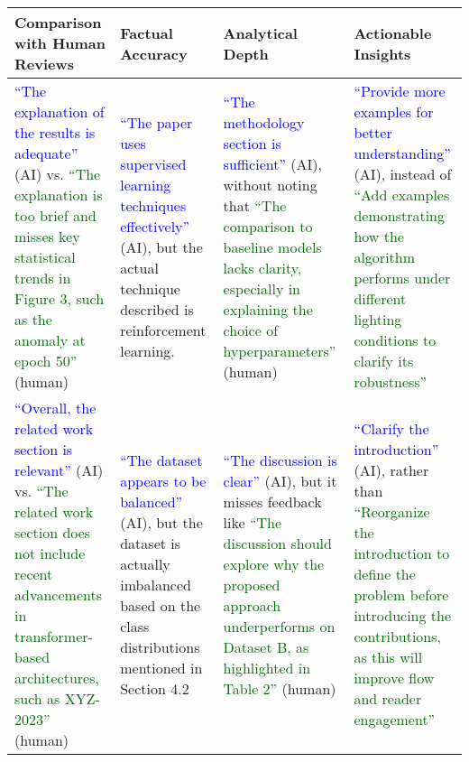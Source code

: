 \documentclass{article}
\begin{document}
\begin{table}[t]
\raggedright
\renewcommand{\arraystretch}{2}
\setlength{\tabcolsep}{8pt}
\begin{tabular}{|p{4cm}|p{4cm}|p{4cm}|p{4cm}|}
\hline
\textbf{\fontsize{12pt}{22pt}\selectfont Comparison with Human Reviews} & \textbf{\fontsize{12pt}{22pt}\selectfont Factual \\ Accuracy} & \textbf{\fontsize{12pt}{22pt}\selectfont Analytical Depth} & \textbf{\fontsize{12pt}{22pt}\selectfont Actionable \\ Insights} \\ \hline

\fontsize{12pt}{22pt}\selectfont 
\textcolor{blue}{``The explanation of the results is adequate''} (AI) vs. 
\textcolor{darkgreen}{``The explanation is too brief and misses key statistical trends in Figure 3, such as the anomaly at epoch 50''} (human)
&
\fontsize{12pt}{22pt}\selectfont 
\textcolor{blue}{``The paper uses supervised learning techniques effectively''} (AI), but the actual technique described is reinforcement learning.
&
\fontsize{12pt}{22pt}\selectfont 
\textcolor{blue}{``The methodology section is sufficient''} (AI), without noting that 
\textcolor{darkgreen}{``The comparison to baseline models lacks clarity, especially in explaining the choice of hyperparameters''} (human)
&
\fontsize{12pt}{22pt}\selectfont 
\textcolor{blue}{``Provide more examples for better understanding''} (AI), instead of 
\textcolor{darkgreen}{``Add examples demonstrating how the algorithm performs under different lighting conditions to clarify its robustness''}
\\ \hline

\fontsize{12pt}{22pt}\selectfont 
\textcolor{blue}{``Overall, the related work section is relevant''} (AI) vs. 
\textcolor{darkgreen}{``The related work section does not include recent advancements in transformer-based architectures, such as XYZ-2023''} (human)
&
\fontsize{12pt}{22pt}\selectfont 
\textcolor{blue}{``The dataset appears to be balanced''} (AI), but the dataset is actually imbalanced based on the class distributions mentioned in Section 4.2
&
\fontsize{12pt}{22pt}\selectfont 
\textcolor{blue}{``The discussion is clear''} (AI), but it misses feedback like 
\textcolor{darkgreen}{``The discussion should explore why the proposed approach underperforms on Dataset B, as highlighted in Table 2''} (human)
&
\fontsize{12pt}{22pt}\selectfont 
\textcolor{blue}{``Clarify the introduction''} (AI), rather than 
\textcolor{darkgreen}{``Reorganize the introduction to define the problem before introducing the contributions, as this will improve flow and reader engagement''}
\\ \hline


\end{tabular}
\end{table}
\end{document}
